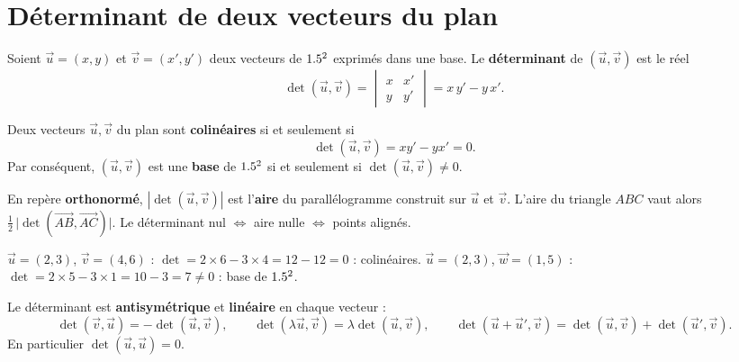 \section{Déterminant de deux vecteurs du plan}

\begin{definition}[Déterminant]
Soient $\vec u=(x,y)$ et $\vec v=(x',y')$ deux vecteurs de $1.5^2$ exprimés dans une base. Le
\textbf{déterminant} de $(\vec u,\vec v)$ est le réel
\[
\det(\vec u,\vec v)=\begin{vmatrix}x&x'\\ y&y'\end{vmatrix}=x\,y'-y\,x'.
\]
\end{definition}

\begin{theoreme}
Deux vecteurs $\vec u,\vec v$ du plan sont \textbf{colinéaires} si et seulement si
\[
\det(\vec u,\vec v)=xy'-yx'=0.
\]
Par conséquent, $(\vec u,\vec v)$ est une \textbf{base} de $1.5^2$ si et seulement si
$\det(\vec u,\vec v)\neq0$.
\end{theoreme}

\begin{remarque}
En repère \textbf{orthonormé}, $|\det(\vec u,\vec v)|$ est l'\textbf{aire} du parallélogramme
construit sur $\vec u$ et $\vec v$. L'aire du triangle $ABC$ vaut alors
$\tfrac12\,\big|\det(\vec{AB},\vec{AC})\big|$. Le déterminant nul $\Leftrightarrow$ aire nulle
$\Leftrightarrow$ points alignés.
\end{remarque}

\begin{exemple}
$\vec u=(2,3)$, $\vec v=(4,6)$ : $\det=2\times6-3\times4=12-12=0$ : colinéaires.\;
$\vec u=(2,3)$, $\vec w=(1,5)$ : $\det=2\times5-3\times1=10-3=7\neq0$ : base de $1.5^2$.
\end{exemple}

\begin{propriete}
Le déterminant est \textbf{antisymétrique} et \textbf{linéaire} en chaque vecteur :
\[
\det(\vec v,\vec u)=-\det(\vec u,\vec v),\qquad
\det(\lambda\vec u,\vec v)=\lambda\det(\vec u,\vec v),\qquad
\det(\vec u+\vec u',\vec v)=\det(\vec u,\vec v)+\det(\vec u',\vec v).
\]
En particulier $\det(\vec u,\vec u)=0$.
\end{propriete}

